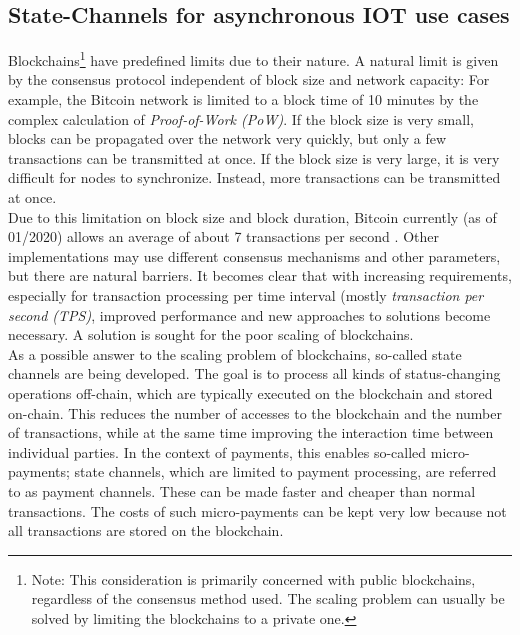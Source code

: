 \documentclass[conference]{IEEEtran}
\begin{document}
\subsection{State-Channels for asynchronous IOT use cases}
Blockchains\footnote{Note: This consideration is primarily concerned with public blockchains, regardless of the consensus method used. The scaling problem can usually be solved by limiting the blockchains to a private one.} have predefined limits due to their nature. A natural limit is given by the consensus protocol independent of block size and network capacity: For example, the Bitcoin network is limited to a block time of 10 minutes by the complex calculation of \textit{Proof-of-Work (PoW)}. If the block size is very small, blocks can be propagated over the network very quickly, but only a few transactions can be transmitted at once. If the block size is very large, it is very difficult for nodes to synchronize. Instead, more transactions can be transmitted at once.\\
Due to this limitation on block size and block duration, Bitcoin currently (as of 01/2020) allows an average of about 7 transactions per second \cite{Macdonald2017}. Other implementations may use different consensus mechanisms and other parameters, but there are natural barriers. It becomes clear that with increasing requirements, especially for transaction processing per time interval (mostly \textit{transaction per second (TPS)}, improved performance and new approaches to solutions become necessary. A solution is sought for the poor scaling of blockchains. \cite{Macdonald2017}\\
As a possible answer to the scaling problem of blockchains, so-called state channels are being developed. The goal is to process all kinds of status-changing operations off-chain, which are typically executed on the blockchain and stored on-chain. This reduces the number of accesses to the blockchain and the number of transactions, while at the same time improving the interaction time between individual parties. In the context of payments, this enables so-called micro-payments; state channels, which are limited to payment processing, are referred to as payment channels. These can be made faster and cheaper than normal transactions. The costs of such micro-payments can be kept very low because not all transactions are stored on the blockchain. \cite{Coleman2018}\\
\end{document}
